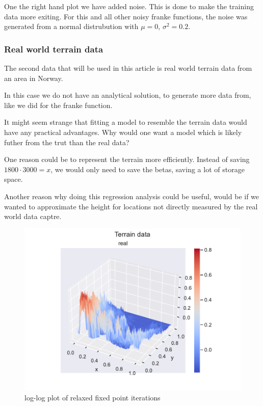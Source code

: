 \documentclass[12pt]{article}
\begin{document}
One the right hand plot we have added noise. This is done to make the training data more exiting. For this and all other noisy franke functions, the noise was generated from a normal distrubution with $\mu=0$, $\sigma^2=0.2$.

\subsubsection{Real world terrain data}

The second data that will be used in this article is real world terrain data from an area in Norway. %

In this case we do not have an analytical solution, to generate more data from, like we did for the franke function.

It might seem strange that fitting a model to resemble the terrain data would have any practical advantages.
Why would one want a model which is likely futher from the trut than the real data?

One reason could be to represent the terrain more efficiently. Instead of saving $1800 \cdot 3000=x$, we would only need to save the betas, saving a lot of storage space.   %

Another reason why doing this regression analysis could be useful, would be if we wanted to approximate the height for locations not directly measured by the real world data captre.


\begin{figure}[H]
    \centering
    \includegraphics[width=\columnwidth]{../src/output/terrain_preview.pdf}
    \caption{log-log plot of relaxed fixed point iterations}
    \label{fig:terrain_function}
\end{figure}
\end{document}

